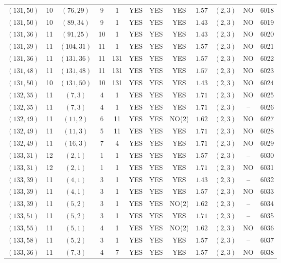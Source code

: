 \begin{longtable}{|c|c|c|c|c|c|c|c|c|c|c|c|}
$(131,50)$ & 10 & $(76,29)$ & 9 & 1 & YES & YES & YES & $1.57$ & $(2,3)$ & NO & 6018\\
$(131,50)$ & 10 & $(89,34)$ & 9 & 1 & YES & YES & YES & $1.43$ & $(2,3)$ & NO & 6019\\
$(131,36)$ & 11 & $(91,25)$ & 10 & 1 & YES & YES & YES & $1.43$ & $(2,3)$ & NO & 6020\\
$(131,39)$ & 11 & $(104,31)$ & 11 & 1 & YES & YES & YES & $1.57$ & $(2,3)$ & NO & 6021\\
$(131,36)$ & 11 & $(131,36)$ & 11 & 131 & YES & YES & YES & $1.57$ & $(2,3)$ & NO & 6022\\
$(131,48)$ & 11 & $(131,48)$ & 11 & 131 & YES & YES & YES & $1.57$ & $(2,3)$ & NO & 6023\\
$(131,50)$ & 10 & $(131,50)$ & 10 & 131 & YES & YES & YES & $1.43$ & $(2,3)$ & NO & 6024\\
$(132,35)$ & 11 & $(7,3)$ & 4 & 1 & YES & YES & YES & $1.71$ & $(2,3)$ & NO & 6025\\
$(132,35)$ & 11 & $(7,3)$ & 4 & 1 & YES & YES & YES & $1.71$ & $(2,3)$ & -- & 6026\\
$(132,49)$ & 11 & $(11,2)$ & 6 & 11 & YES & YES & NO(2) & $1.62$ & $(2,3)$ & NO & 6027\\
$(132,49)$ & 11 & $(11,3)$ & 5 & 11 & YES & YES & YES & $1.71$ & $(2,3)$ & NO & 6028\\
$(132,49)$ & 11 & $(16,3)$ & 7 & 4 & YES & YES & YES & $1.71$ & $(2,3)$ & NO & 6029\\
$(133,31)$ & 12 & $(2,1)$ & 1 & 1 & YES & YES & YES & $1.57$ & $(2,3)$ & -- & 6030\\
$(133,31)$ & 12 & $(2,1)$ & 1 & 1 & YES & YES & YES & $1.71$ & $(2,3)$ & NO & 6031\\
$(133,39)$ & 11 & $(4,1)$ & 3 & 1 & YES & YES & YES & $1.43$ & $(2,3)$ & -- & 6032\\
$(133,39)$ & 11 & $(4,1)$ & 3 & 1 & YES & YES & YES & $1.57$ & $(2,3)$ & NO & 6033\\
$(133,39)$ & 11 & $(5,2)$ & 3 & 1 & YES & YES & NO(2) & $1.62$ & $(2,3)$ & -- & 6034\\
$(133,51)$ & 11 & $(5,2)$ & 3 & 1 & YES & YES & YES & $1.71$ & $(2,3)$ & -- & 6035\\
$(133,55)$ & 11 & $(5,1)$ & 4 & 1 & YES & YES & NO(2) & $1.62$ & $(2,3)$ & NO & 6036\\
$(133,58)$ & 11 & $(5,2)$ & 3 & 1 & YES & YES & YES & $1.57$ & $(2,3)$ & -- & 6037\\
$(133,36)$ & 11 & $(7,3)$ & 4 & 7 & YES & YES & YES & $1.57$ & $(2,3)$ & NO & 6038\\

\end{longtable}
